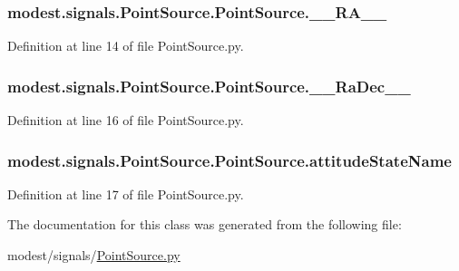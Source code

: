 \subsubsection[{\texorpdfstring{\+\_\+\+\_\+\+R\+A\+\_\+\+\_\+}{__RA__}}]{\setlength{\rightskip}{0pt plus 5cm}modest.\+signals.\+Point\+Source.\+Point\+Source.\+\_\+\+\_\+\+R\+A\+\_\+\+\_\+\hspace{0.3cm}{\ttfamily [private]}}\hypertarget{classmodest_1_1signals_1_1PointSource_1_1PointSource_aebbf89bfdecbfe1b98e6f835398e475f}{}\label{classmodest_1_1signals_1_1PointSource_1_1PointSource_aebbf89bfdecbfe1b98e6f835398e475f}


Definition at line 14 of file Point\+Source.\+py.

\subsubsection[{\texorpdfstring{\+\_\+\+\_\+\+Ra\+Dec\+\_\+\+\_\+}{__RaDec__}}]{\setlength{\rightskip}{0pt plus 5cm}modest.\+signals.\+Point\+Source.\+Point\+Source.\+\_\+\+\_\+\+Ra\+Dec\+\_\+\+\_\+\hspace{0.3cm}{\ttfamily [private]}}\hypertarget{classmodest_1_1signals_1_1PointSource_1_1PointSource_a5e8336566a9029e0e61f743ba0c76719}{}\label{classmodest_1_1signals_1_1PointSource_1_1PointSource_a5e8336566a9029e0e61f743ba0c76719}


Definition at line 16 of file Point\+Source.\+py.

\subsubsection[{\texorpdfstring{attitude\+State\+Name}{attitudeStateName}}]{\setlength{\rightskip}{0pt plus 5cm}modest.\+signals.\+Point\+Source.\+Point\+Source.\+attitude\+State\+Name}\hypertarget{classmodest_1_1signals_1_1PointSource_1_1PointSource_ae9aec6bf600ed9b925e2428e7da0a8fb}{}\label{classmodest_1_1signals_1_1PointSource_1_1PointSource_ae9aec6bf600ed9b925e2428e7da0a8fb}


Definition at line 17 of file Point\+Source.\+py.



The documentation for this class was generated from the following file\+:\begin{DoxyCompactItemize}
\item 
modest/signals/\hyperlink{PointSource_8py}{Point\+Source.\+py}\end{DoxyCompactItemize}
